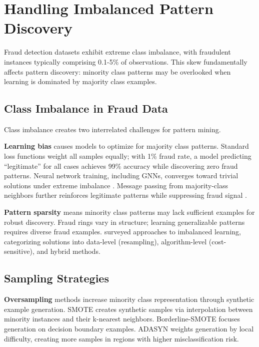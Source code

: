 \section{Handling Imbalanced Pattern Discovery}
\label{sec:2_5}

Fraud detection datasets exhibit extreme class imbalance, with fraudulent instances typically comprising 0.1-5\% of observations. This skew fundamentally affects pattern discovery: minority class patterns may be overlooked when learning is dominated by majority class examples.

\subsection{Class Imbalance in Fraud Data}

Class imbalance creates two interrelated challenges for pattern mining.

\textbf{Learning bias} causes models to optimize for majority class patterns. Standard loss functions weight all samples equally; with 1\% fraud rate, a model predicting ``legitimate'' for all cases achieves 99\% accuracy while discovering zero fraud patterns. Neural network training, including GNNs, converges toward trivial solutions under extreme imbalance \cite{buda2018systematic}. Message passing from majority-class neighbors further reinforces legitimate patterns while suppressing fraud signal \cite{liu2021heterogeneous}.

\textbf{Pattern sparsity} means minority class patterns may lack sufficient examples for robust discovery. Fraud rings vary in structure; learning generalizable patterns requires diverse fraud examples. \citeauthor{he2009learning} \cite{he2009learning} surveyed approaches to imbalanced learning, categorizing solutions into data-level (resampling), algorithm-level (cost-sensitive), and hybrid methods.

\subsection{Sampling Strategies}

\textbf{Oversampling} methods increase minority class representation through synthetic example generation. SMOTE \cite{chawla2002smote} creates synthetic samples via interpolation between minority instances and their k-nearest neighbors. Borderline-SMOTE \cite{han2005borderline} focuses generation on decision boundary examples. ADASYN \cite{he2008adasyn} weights generation by local difficulty, creating more samples in regions with higher misclassification risk.

